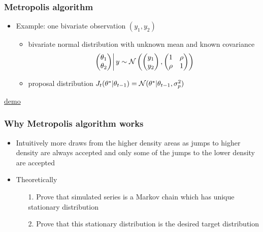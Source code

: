 \documentclass[10pt]{beamer}
\begin{document}
\begin{frame}

\frametitle{ Metropolis algorithm}

  \begin{itemize}
  \item Example: one bivariate observation $(y_1,y_2)$
    \begin{itemize}
    \item bivariate normal distribution with unknown mean and known
      covariance
       \begin{equation*}
         \left.
         \begin{pmatrix}
           \theta_1\\
           \theta_2
         \end{pmatrix}
         \right| y \sim
         \mathcal{N}\left(
           \begin{pmatrix}
             y_1\\
             y_2
           \end{pmatrix},
           \begin{pmatrix}
             1 & \rho\\
             \rho & 1
         \end{pmatrix}
       \right)
       \end{equation*}
     \item proposal distribution
       $J_t(\theta^{*}|\theta_{t-1})=\mathcal{N}(\theta^{*}|\theta_{t-1},\sigma_p^2)$
     \end{itemize}
   \end{itemize}

  \center
  \href{https://chi-feng.github.io/mcmc-demo/app.html?algorithm=RandomWalkMH&target=standard}{demo}

\end{frame}

 \begin{frame}

\frametitle{Why Metropolis algorithm works}

  \begin{itemize}
  \item Intuitively more draws from the higher density areas as
    jumps to higher density are always accepted and only some of the
    jumps to the lower density are accepted
    \vspace{5mm}
    \pause
  \item Theoretically
    \begin{itemize}
    \item[1.] Prove that simulated series is a Markov chain
      which has unique stationary distribution
    \item[2.] Prove that this stationary distribution is the desired target distribution
    \end{itemize}
\end{itemize}

\end{frame}
\end{document}
